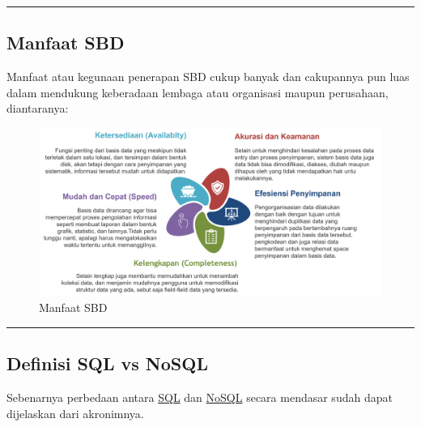 \documentclass[
]{book}
\begin{document}
\begin{center}\rule{0.5\linewidth}{0.5pt}\end{center}

\hypertarget{manfaat-sbd}{%
\subsection{Manfaat SBD}\label{manfaat-sbd}}

Manfaat atau kegunaan penerapan SBD cukup banyak dan cakupannya pun luas dalam mendukung keberadaan lembaga atau organisasi maupun perusahaan, diantaranya:

\begin{figure}

{\centering \includegraphics[width=1\linewidth]{./images/Bab1/manfaat_DB} 

}

\caption{Manfaat SBD}\label{fig:manfaat}
\end{figure}

\begin{center}\rule{0.5\linewidth}{0.5pt}\end{center}

\hypertarget{definisi-sql-vs-nosql}{%
\subsection{Definisi SQL vs NoSQL}\label{definisi-sql-vs-nosql}}

Sebenarnya perbedaan antara \href{https://www.dewaweb.com/blog/sql-pengertian-fungsi-beserta-perintah-dasarnya/}{SQL} dan \href{https://aws.amazon.com/id/nosql/}{NoSQL} secara mendasar sudah dapat dijelaskan dari akronimnya.
\end{document}
